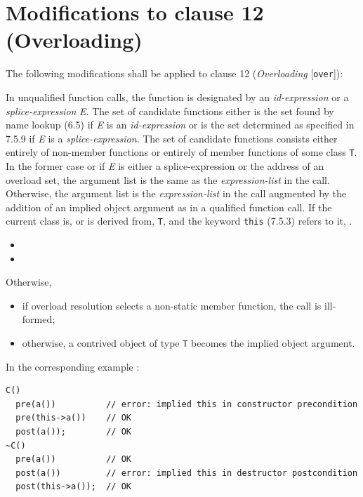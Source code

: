 \section{Modifications to clause 12 (Overloading)}

The following modifications shall be applied to clause 12 (\emph{Overloading}
[\texttt{over}]): 

\begin{modification}
In unqualified function calls, the function is designated by an
\emph{id-expression} or
a \emph{splice-expression} \emph{E}. The set of candidate functions either is the set found by
name lookup (6.5) if \emph{E} is an \emph{id-expression} or is the set determined as specified
in 7.5.9 if \emph{E} is a \emph{splice-expression}. The set of candidate functions consists
either entirely of non-member functions or entirely of member functions of some
class \texttt{T}. In the former case or if \emph{E} is either a splice-expression or the address
of an overload set, the argument list is the same as the \emph{expression-list} in the
call. Otherwise, the argument list is the \emph{expression-list} in the call augmented
by the addition of an implied object argument as in a qualified function call.
If the current class is, or is derived from, \texttt{T}, and the keyword
\texttt{this} (7.5.3)
refers to it, .

\begin{itemize}[label=\textemdash]

\item
{}

\item
{}

\end{itemize}

Otherwise,

\begin{itemize}[label=\textemdash]

\item 
if overload resolution selects a non-static member function, the call is ill-formed;

\item
otherwise, a contrived object of type \texttt{T} becomes the implied object argument.

\end{itemize}

In the corresponding example :
\begin{verbatim}
C()
  pre(a())          // error: implied this in constructor precondition
  pre(this->a())    // OK
  post(a());        // OK
~C()                
  pre(a())          // OK
  post(a())         // error: implied this in destructor postcondition
  post(this->a());  // OK
\end{verbatim}

\end{modification}
